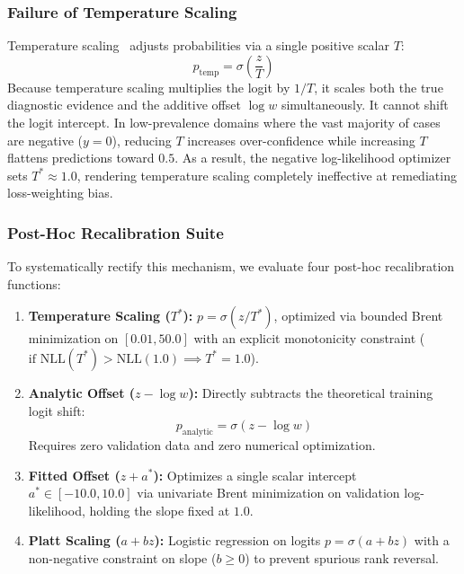 \documentclass[journal]{IEEEtran}
\begin{document}
\subsubsection{Failure of Temperature Scaling}
Temperature scaling~\cite{guo2017calibration} adjusts probabilities via a single positive scalar $T$:
\begin{equation}
p_{\text{temp}} = \sigma\left(\frac{z}{T}\right)
\end{equation}
Because temperature scaling multiplies the logit by $1/T$, it scales both the true diagnostic evidence and the additive offset $\log w$ simultaneously. It cannot shift the logit intercept. In low-prevalence domains where the vast majority of cases are negative ($y=0$), reducing $T$ increases over-confidence while increasing $T$ flattens predictions toward $0.5$. As a result, the negative log-likelihood optimizer sets $T^* \approx 1.0$, rendering temperature scaling completely ineffective at remediating loss-weighting bias.

\subsubsection{Post-Hoc Recalibration Suite}
To systematically rectify this mechanism, we evaluate four post-hoc recalibration functions:
\begin{enumerate}
    \item \textbf{Temperature Scaling ($T^*$):} $p = \sigma(z / T^*)$, optimized via bounded Brent minimization on $[0.01, 50.0]$ with an explicit monotonicity constraint ($\text{if } \text{NLL}(T^*) > \text{NLL}(1.0) \implies T^* = 1.0$).
    \item \textbf{Analytic Offset ($z - \log w$):} Directly subtracts the theoretical training logit shift:
    \begin{equation}
    p_{\text{analytic}} = \sigma(z - \log w)
    \end{equation}
    Requires zero validation data and zero numerical optimization.
    \item \textbf{Fitted Offset ($z + a^*$):} Optimizes a single scalar intercept $a^* \in [-10.0, 10.0]$ via univariate Brent minimization on validation log-likelihood, holding the slope fixed at $1.0$.
    \item \textbf{Platt Scaling ($a + bz$):} Logistic regression on logits $p = \sigma(a + bz)$ with a non-negative constraint on slope ($b \ge 0$) to prevent spurious rank reversal.
\end{enumerate}
\end{document}
